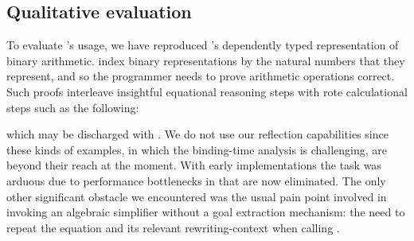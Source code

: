 \subsection{Qualitative evaluation}
To evaluate \Frexlib{}'s usage, we have reproduced
\citeauthor{brady-mckinna-et-al:indexed-binary}'s \citeyearpar{brady-mckinna-et-al:indexed-binary}
dependently typed representation of binary
arithmetic. \citeauthor{brady-mckinna-et-al:indexed-binary} index
binary representations by the natural numbers that they represent, and
so the programmer needs to prove arithmetic operations correct.
Such proofs interleave insightful
equational reasoning steps with rote calculational steps
such as the following:
\begin{center}
\FrexifyLHS{} \IdrisFunction{=} \FrexifyRHS{}
\end{center}
which may be discharged with .
We do not use our reflection capabilities since
these kinds of examples, in which the binding-time analysis is challenging,
are beyond their reach at the moment.
%
With early \Frexlib{} implementations the task was arduous due to
performance bottlenecks in \idris{} that are now eliminated.
%
The only other significant obstacle we encountered was the usual pain
point involved in invoking an algebraic simplifier without a goal
extraction mechanism: the need to repeat the equation and its relevant
rewriting-context when calling \Frexlib{}.
